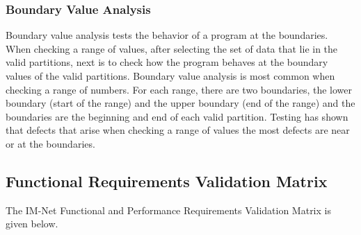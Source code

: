 \documentclass[letterpaper,12pt]{article}
\begin{document}
{\textcolor{subsubsection}{\subsubsection{Boundary Value Analysis}}
Boundary value analysis tests the behavior of a program at the boundaries. When checking a range of values, after selecting the set of data that lie in the valid partitions, next is to check how the program behaves at the boundary values of the valid partitions. Boundary value analysis is most common when checking a range of numbers. For each range, there are two boundaries, the lower boundary (start of the range) and the upper boundary (end of the range) and the boundaries are the beginning and end of each valid partition. Testing has shown that defects that arise when checking a range of values the most defects are near or at the boundaries.


\textcolor{subsection}{\subsection{Functional Requirements Validation Matrix}}
The IM-Net Functional and Performance Requirements Validation Matrix is given below.

}
\end{document}
